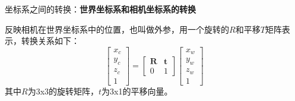 \documentclass[10pt]{article}
\begin{document}
坐标系之间的转换：\textbf{世界坐标系和相机坐标系的转换}

反映相机在世界坐标系中的位置，也叫做外参，用一个旋转的$R$和平移$T$矩阵表示，转换关系如下：
$$\left[\begin{array}{l}         x_c\\y_c\\z_c\\1                      \end{array}\right] = 
\left[\begin{array}{ll}         \textbf{R} & \textbf{t} \\ 0 & 1              \end{array}\right]
\left[\begin{array}{l}        x_w\\y_w\\z_w\\1                        \end{array}\right] $$
其中$R$为3x3的旋转矩阵，$t$为3x1的平移向量。
\end{document}
